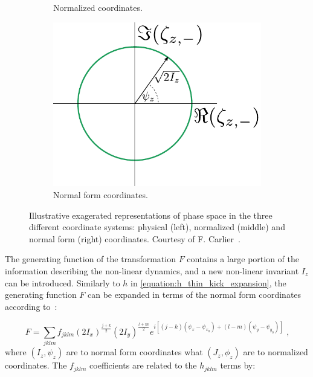 \begin{figure}[!hbt]
\begin{center}
\begin{subfigure}[b]{0.30\textwidth}
\begin{center}
        \caption{Normalized coordinates.}
        \label{fig:phase_space_normalized_non-linear}
        \end{center}
    \end{subfigure}
    \hfill
    \begin{subfigure}[b]{0.3805\textwidth}
        \begin{center}
        \includegraphics[width=\textwidth]{Figures/Beam_Dynamics_Theory/phase_space_nonlinear_normal_form.pdf}
        \caption{Normal form coordinates.}
        \label{fig:phase_space_normal_form_non-linear}
        \end{center}
    \end{subfigure}
    \caption{Illustrative exagerated representations of phase space in the three different coordinate systems: physical (left), normalized (middle) and normal form (right) coordinates. Courtesy of F. Carlier~\cite{PHD:Carlier}.}
    \label{figure:phase_space_non-linear_physical_normalized_normal_form_coordinates}
    \end{center}
\end{figure}

The generating function of the transformation \(F\) contains a large portion of the information describing the non-linear dynamics, and a new non-linear invariant \(I_z\) can be introduced. 
Similarly to \(h\) in \cref{equation:h_thin_kick_expansion}, the generating function \(F\) can be expanded in terms of the normal form coordinates according to~\cite{PHD:Franchi}:

\begin{equation}
    F = \sum_{jklm} f_{jklm} \left( 2 I_x \right)^{\frac{j+k}{2}} \left(2 I_y \right)^{\frac{l+m}{2}} e^{i \left[ (j-k) \left( \psi_x - \psi_{x_0} \right) + (l-m) \left( \psi_y - \psi_{y_0} \right) \right]} \text{ ,}
    \label{equation:generating_function_expansion}
\end{equation}
where \((I_z, \psi_z)\) are to normal form coordinates what \((J_z, \phi_z)\) are to normalized coordinates.
The \(f_{jklm}\) coefficients are related to the \(h_{jklm}\) terms by:

